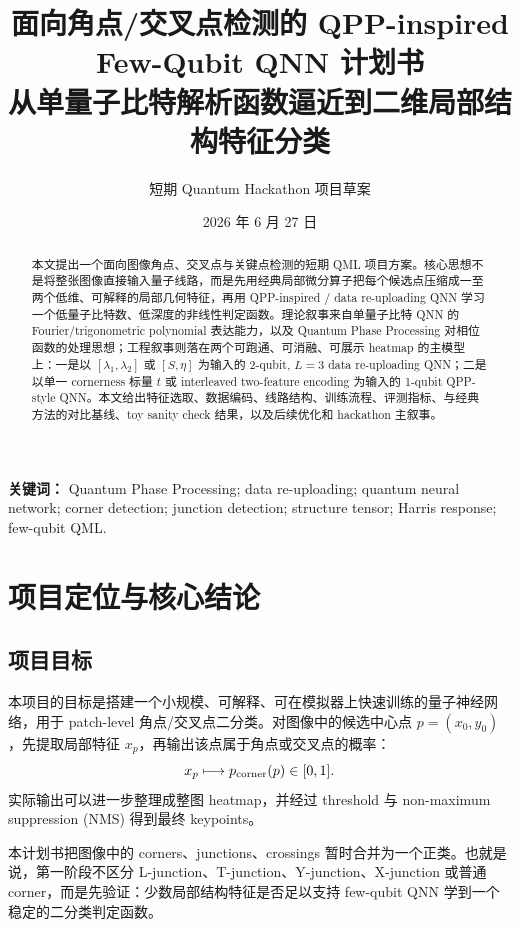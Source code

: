 \documentclass[UTF8,zihao=-4]{ctexart}
\title{\bfseries 面向角点/交叉点检测的 QPP-inspired Few-Qubit QNN 计划书\\[0.35em]
\large 从单量子比特解析函数逼近到二维局部结构特征分类}
\author{短期 Quantum Hackathon 项目草案}
\date{2026 年 6 月 27 日}
\begin{document}
\maketitle

\begin{abstract}
本文提出一个面向图像角点、交叉点与关键点检测的短期 QML 项目方案。核心思想不是将整张图像直接输入量子线路，而是先用经典局部微分算子把每个候选点压缩成一至两个低维、可解释的局部几何特征，再用 QPP-inspired / data re-uploading QNN 学习一个低量子比特数、低深度的非线性判定函数。理论叙事来自单量子比特 QNN 的 Fourier/trigonometric polynomial 表达能力，以及 Quantum Phase Processing 对相位函数的处理思想；工程叙事则落在两个可跑通、可消融、可展示 heatmap 的主模型上：一是以 $[\lambda_1,\lambda_2]$ 或 $[S,\eta]$ 为输入的 2-qubit, $L=3$ data re-uploading QNN；二是以单一 cornerness 标量 $t$ 或 interleaved two-feature encoding 为输入的 1-qubit QPP-style QNN。本文给出特征选取、数据编码、线路结构、训练流程、评测指标、与经典方法的对比基线、toy sanity check 结果，以及后续优化和 hackathon 主叙事。
\end{abstract}

\noindent\textbf{关键词：} Quantum Phase Processing; data re-uploading; quantum neural network; corner detection; junction detection; structure tensor; Harris response; few-qubit QML.

\tableofcontents
\newpage

\section{项目定位与核心结论}

\subsection{项目目标}

本项目的目标是搭建一个小规模、可解释、可在模拟器上快速训练的量子神经网络，用于 patch-level 角点/交叉点二分类。对图像中的候选中心点 $p=(x_0,y_0)$，先提取局部特征 $x_p$，再输出该点属于角点或交叉点的概率：
\begin{equation}
    x_p \longmapsto p_{\rm corner}(p)\in[0,1].
\end{equation}
实际输出可以进一步整理成整图 heatmap，并经过 threshold 与 non-maximum suppression (NMS) 得到最终 keypoints。

本计划书把图像中的 corners、junctions、crossings 暂时合并为一个正类。也就是说，第一阶段不区分 L-junction、T-junction、Y-junction、X-junction 或普通 corner，而是先验证：少数局部结构特征是否足以支持 few-qubit QNN 学到一个稳定的二分类判定函数。
\end{document}
